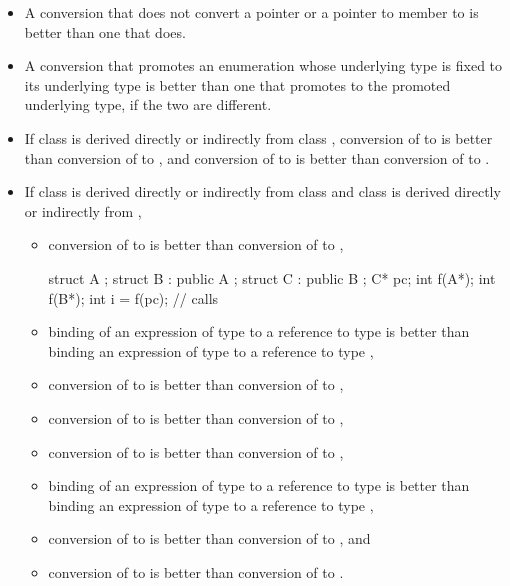 \begin{itemize}
\item
A conversion that does not convert a pointer or a pointer to member
to
is better than one that does.

\item
A conversion that promotes an enumeration whose underlying type is fixed to its underlying
type is better than one that promotes to the promoted underlying type, if the two are
different.

\item
If class
is derived directly or indirectly from class
,
conversion of
to
is better than conversion of
to
,
and conversion of
to
is better than conversion
of
to
.
\item
If class
is derived directly or indirectly from class
and class
is derived directly or indirectly from
,

\begin{itemize}
\item
conversion of
to
is better than conversion of
to
,
\begin{example}

\begin{codeblock}
struct A {};
struct B : public A {};
struct C : public B {};
C* pc;
int f(A*);
int f(B*);
int i = f(pc);                  // calls 
\end{codeblock}
\end{example}

\item
binding of an expression of type
to a reference to type
is better than binding an expression of type
to a reference to type
,
\item
conversion of
to
is better than conversion of
to
,
\item
conversion of
to
is better than conversion of
to
,
\item
conversion of
to
is better than conversion of
to
,
\item
binding of an expression of type
to a reference to type
is better than binding an expression of type
to a
reference to type
,
\item
conversion of
to
is better than conversion
of
to
,
and
\item
conversion of
to
is better than conversion of
to
.
\end{itemize}


\end{itemize}
